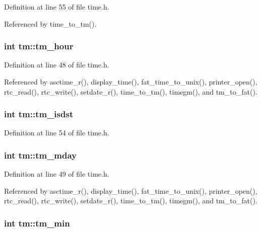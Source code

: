 Definition at line 55 of file time.\-h.



Referenced by time\-\_\-to\-\_\-tm().

\hypertarget{structtm_a3e7ca4e37f1abcaf56b8a916c38eb9fe}{
\subsubsection[{tm\-\_\-hour}]{\setlength{\rightskip}{0pt plus 5cm}int tm\-::tm\-\_\-hour}}\label{structtm_a3e7ca4e37f1abcaf56b8a916c38eb9fe}


Definition at line 48 of file time.\-h.



Referenced by asctime\-\_\-r(), display\-\_\-time(), fat\-\_\-time\-\_\-to\-\_\-unix(), printer\-\_\-open(), rtc\-\_\-read(), rtc\-\_\-write(), setdate\-\_\-r(), time\-\_\-to\-\_\-tm(), timegm(), and tm\-\_\-to\-\_\-fat().

\hypertarget{structtm_a5645ca0580c8ab2c24f6c2965d9c9f9c}{
\subsubsection[{tm\-\_\-isdst}]{\setlength{\rightskip}{0pt plus 5cm}int tm\-::tm\-\_\-isdst}}\label{structtm_a5645ca0580c8ab2c24f6c2965d9c9f9c}


Definition at line 54 of file time.\-h.

\hypertarget{structtm_ab8d8904bad43b0c8b96e61941c5b5310}{
\subsubsection[{tm\-\_\-mday}]{\setlength{\rightskip}{0pt plus 5cm}int tm\-::tm\-\_\-mday}}\label{structtm_ab8d8904bad43b0c8b96e61941c5b5310}


Definition at line 49 of file time.\-h.



Referenced by asctime\-\_\-r(), display\-\_\-time(), fat\-\_\-time\-\_\-to\-\_\-unix(), printer\-\_\-open(), rtc\-\_\-read(), rtc\-\_\-write(), setdate\-\_\-r(), time\-\_\-to\-\_\-tm(), timegm(), and tm\-\_\-to\-\_\-fat().

\hypertarget{structtm_af414eb7c86cc3099595211eee4d4211b}{
\subsubsection[{tm\-\_\-min}]{\setlength{\rightskip}{0pt plus 5cm}int tm\-::tm\-\_\-min}}\label{structtm_af414eb7c86cc3099595211eee4d4211b}


